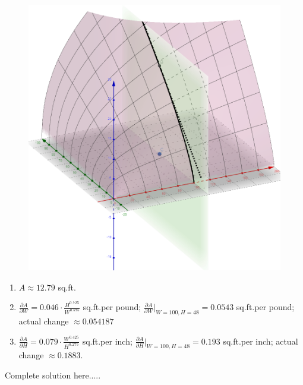 \begin{example}
\begin{enumerate}[leftmargin=*]
\begin{figure}[h!]
        \includegraphics[scale=0.5]{images/twoVariables/ex19_2c.png}
    \end{figure}
    \end{enumerate}
    \begin{sol}
    \renewcommand{\labelenumi}{\textbf{(\alph{enumi})}}
    \begin{enumerate}[leftmargin=*]
    \item $A\approx 12.79$ sq.ft.
    \item $\displaystyle \frac{\partial A}{\partial W}=0.046\cdot \frac{H^{0.725}}{W^{0.575}}$ sq.ft.per pound; $\displaystyle \frac{\partial A}{\partial W}\Big|_{W=100,H=48}=0.0543$ sq.ft.per pound; actual change $\approx 0.054187$
    \item $\displaystyle \frac{\partial A}{\partial H}=0.079\cdot \frac{W^{0.425}}{H^{0.275}}$ sq.ft.per inch; $\displaystyle \frac{\partial A}{\partial H}\Big|_{W=100,H=48}=0.193$ sq.ft.per inch; actual change $\approx 0.1883$.
    \end{enumerate}
    \end{sol}
    \begin{solL}
    Complete solution here.....
    
    \end{solL}
    
\end{example}
